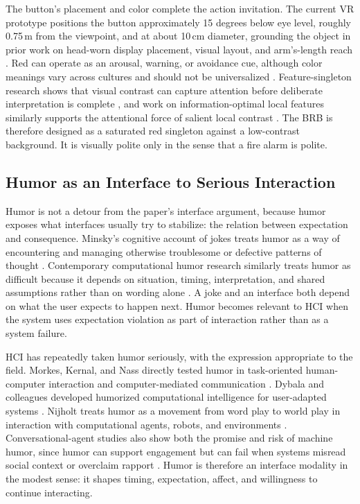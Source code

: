The button's placement and color complete the action invitation. The current VR prototype positions the button approximately 15 degrees below eye level, roughly 0.75\,m from the viewpoint, and at about 10\,cm diameter, grounding the object in prior work on head-worn display placement, visual layout, and arm's-length reach \citep{Lin2021,Alghofaili2019,Bonin2022}. Red can operate as an arousal, warning, or avoidance cue, although color meanings vary across cultures and should not be universalized \citep{ElliotMaier2014,GaoEtAl2007}. Feature-singleton research shows that visual contrast can capture attention before deliberate interpretation is complete \citep{Li2008}, and work on information-optimal local features similarly supports the attentional force of salient local contrast \citep{CastellottiEtAl2022}. The BRB is therefore designed as a saturated red singleton against a low-contrast background. It is visually polite only in the sense that a fire alarm is polite.

\subsection{Humor as an Interface to Serious Interaction}

Humor is not a detour from the paper's interface argument, because humor exposes what interfaces usually try to stabilize: the relation between expectation and consequence. Minsky's cognitive account of jokes treats humor as a way of encountering and managing otherwise troublesome or defective patterns of thought \citep{Minsky1980Jokes}. Contemporary computational humor research similarly treats humor as difficult because it depends on situation, timing, interpretation, and shared assumptions rather than on wording alone \citep{Cowie2023ComputationalHumor,LemmensDeMarez2026HumorSurvey}. A joke and an interface both depend on what the user expects to happen next. Humor becomes relevant to HCI when the system uses expectation violation as part of interaction rather than as a system failure.

HCI has repeatedly taken humor seriously, with the expression appropriate to the field. Morkes, Kernal, and Nass directly tested humor in task-oriented human-computer interaction and computer-mediated communication \citep{MorkesEtAl1999HumorHCI}. Dybala and colleagues developed humorized computational intelligence for user-adapted systems \citep{DybalaEtAl2009HumorizedCI}. Nijholt treats humor as a movement from word play to world play in interaction with computational agents, robots, and environments \citep{Nijholt2018WordPlayWorldPlay}. Conversational-agent studies also show both the promise and risk of machine humor, since humor can support engagement but can fail when systems misread social context or overclaim rapport \citep{ZarghamEtAl2023FunnyHow,SunEtAl2024FunnyChatbot}. Humor is therefore an interface modality in the modest sense: it shapes timing, expectation, affect, and willingness to continue interacting.

